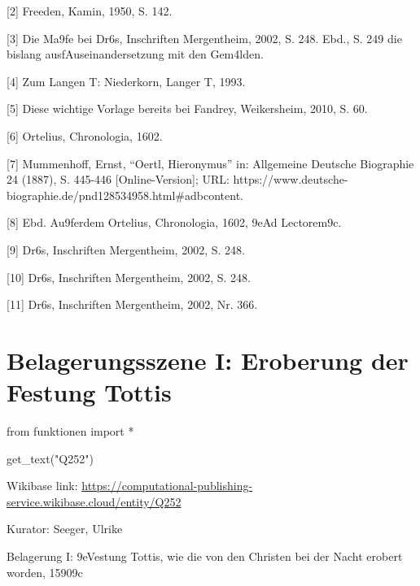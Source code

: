 \documentclass[
  letterpaper,
]{book}
\newenvironment{Shaded}{\begin{snugshade}}{\end{snugshade}}
\newcommand{\ImportTok}[1]{\textcolor[rgb]{0.00,0.46,0.62}{#1}}
\newcommand{\NormalTok}[1]{\textcolor[rgb]{0.00,0.23,0.31}{#1}}
\newcommand{\OperatorTok}[1]{\textcolor[rgb]{0.37,0.37,0.37}{#1}}
\newcommand{\StringTok}[1]{\textcolor[rgb]{0.13,0.47,0.30}{#1}}
\begin{document}
{[}2{]} Freeden, Kamin, 1950, S. 142.

{[}3{]} Die Ma\x9fe bei Dr\xb6s, Inschriften Mergentheim, 2002,
S. 248. Ebd., S. 249 die bislang
ausf\xbchrlichste Auseinandersetzung mit den Gem\xa4lden.

{[}4{]} Zum Langen T\xbcrkenkrieg: Niederkorn, Langer
T\xbcrkenkrieg, 1993.

{[}5{]} Diese wichtige Vorlage bereits bei Fandrey, Weikersheim, 2010,
S. 60.

{[}6{]} Ortelius, Chronologia, 1602.

{[}7{]} Mummenhoff, Ernst, ``Oertl, Hieronymus'' in: Allgemeine Deutsche
Biographie 24 (1887), S. 445-446 {[}Online-Version{]}; URL:
https://www.deutsche-biographie.de/pnd128534958.html\#adbcontent.

{[}8{]} Ebd. Au\x9ferdem Ortelius, Chronologia, 1602, \x9eAd
Lectorem\x9c.

{[}9{]} Dr\xb6s, Inschriften Mergentheim, 2002, S.
248.

{[}10{]} Dr\xb6s, Inschriften Mergentheim, 2002, S.
248.

{[}11{]} Dr\xb6s, Inschriften Mergentheim, 2002, Nr. 366.


\chapter{Belagerungsszene I: Eroberung der Festung
Tottis}\label{belagerungsszene-i-eroberung-der-festung-tottis}

\begin{Shaded}
\begin{Highlighting}[]
\ImportTok{from}\NormalTok{ funktionen }\ImportTok{import} \OperatorTok{*}
\end{Highlighting}
\end{Shaded}

\begin{Shaded}
\begin{Highlighting}[]
\NormalTok{get\_text(}\StringTok{"Q252"}\NormalTok{)}
\end{Highlighting}
\end{Shaded}

Wikibase link:
\url{https://computational-publishing-service.wikibase.cloud/entity/Q252}

Kurator: Seeger, Ulrike

Belagerung I: \x9eVestung Tottis, wie die von den Christen bei
der Nacht erobert worden, 1590\x9c
\end{document}
